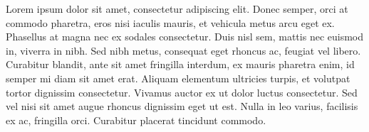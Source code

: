 Lorem ipsum dolor sit amet, consectetur adipiscing elit. Donec semper, orci at commodo pharetra, eros nisi iaculis mauris, et vehicula metus arcu eget ex. Phasellus at magna nec ex sodales consectetur. Duis nisl sem, mattis nec euismod in, viverra in nibh. Sed nibh metus, consequat eget rhoncus ac, feugiat vel libero. Curabitur blandit, ante sit amet fringilla interdum, ex mauris pharetra enim, id semper mi diam sit amet erat. Aliquam elementum ultricies turpis, et volutpat tortor dignissim consectetur. Vivamus auctor ex ut dolor luctus consectetur. Sed vel nisi sit amet augue rhoncus dignissim eget ut est. Nulla in leo varius, facilisis ex ac, fringilla orci. Curabitur placerat tincidunt commodo.
